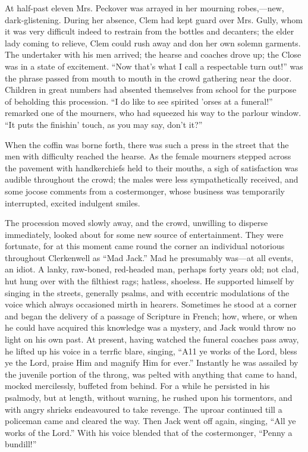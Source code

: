 At half-past eleven Mrs. Peckover was arrayed in her mourning
robes,---new, dark-glistening. During her absence, Clem had kept guard
over Mrs. Gully, whom it was very difficult indeed to restrain from the
bottles and decanters; the elder lady coming to relieve, Clem could rush
away and don her own solemn garments. The undertaker with his men
arrived; the hearse and coaches drove up; the Close was in a state of
excitement. ``Now that's what I call a respectable turn out!'' was the
phrase passed from mouth to mouth in the crowd gathering near the door.
Children in great numbers had {}absented themselves from school for the
purpose of beholding this procession. ``I do like to see spirited 'orses
at a funeral!'' remarked one of the mourners, who had squeezed his way
to the parlour window. ``It puts the finishin' touch, as you may say,
don't it?''

When the coffin was borne forth, there was such a press in the street
that the men with difficulty reached the hearse. As the female mourners
stepped across the pavement with handkerchiefs held to their mouths, a
sigh of satisfaction was audible throughout the crowd; the males were
less sympathetically received, and some jocose comments from a
costermonger, whose business was temporarily interrupted, excited
indulgent smiles.

The procession moved slowly away, and the crowd, unwilling to disperse
immediately, looked about for some new source of entertainment. They
were fortunate, for at this moment came round the corner an individual
notorious throughout Clerkenwell as ``Mad Jack.'' Mad he presumably
was---at all events, an idiot. A lanky, raw-boned, {}red-headed man,
perhaps forty years old; not clad, hut hung over with the filthiest
rags; hatless, shoeless. He supported himself by singing in the streets,
generally psalms, and with eccentric modulations of the voice which
always occasioned mirth in hearers. Sometimes he stood at a corner and
began the delivery of a passage of Scripture in French; how, where, or
when he could have acquired this knowledge was a mystery, and Jack would
throw no light on his own past. At present, having watched the funeral
coaches pass away, he lifted up his voice in a terrfic blare, singing,
``A11 ye works of the Lord, bless ye the Lord, praise Him and magnify
Him for ever.'' Instantly he was assailed by the juvenile portion of the
throng, was pelted with anything that came to hand, mocked mercilessly,
buffeted from behind. For a while he persisted in his psalmody, but at
length, without warning, he rushed upon his tormentors, and with angry
shrieks endeavoured to take revenge. The uproar continued till a
policeman came and cleared {}the way. Then Jack went off again, singing,
``All ye works of the Lord.'' With his voice blended that of the
costermonger, ``Penny a bundill!''

